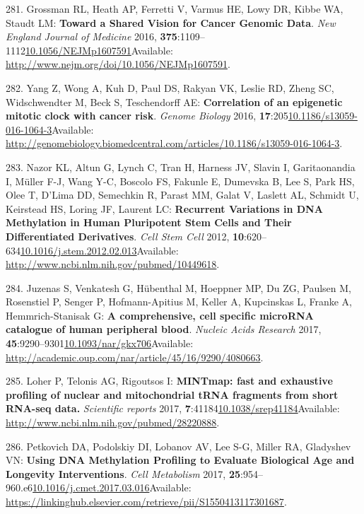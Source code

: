 \documentclass[
]{book}
\begin{document}
\leavevmode\hypertarget{ref-Grossman2016}{}%
281. Grossman RL, Heath AP, Ferretti V, Varmus HE, Lowy DR, Kibbe WA, Staudt LM: \textbf{Toward a Shared Vision for Cancer Genomic Data}. \emph{New England Journal of Medicine} 2016, \textbf{375}:1109--1112\href{https://doi.org/10.1056/NEJMp1607591}{10.1056/NEJMp1607591}Available: \url{http://www.nejm.org/doi/10.1056/NEJMp1607591}.

\leavevmode\hypertarget{ref-Yang2016}{}%
282. Yang Z, Wong A, Kuh D, Paul DS, Rakyan VK, Leslie RD, Zheng SC, Widschwendter M, Beck S, Teschendorff AE: \textbf{Correlation of an epigenetic mitotic clock with cancer risk}. \emph{Genome Biology} 2016, \textbf{17}:205\href{https://doi.org/10.1186/s13059-016-1064-3}{10.1186/s13059-016-1064-3}Available: \url{http://genomebiology.biomedcentral.com/articles/10.1186/s13059-016-1064-3}.

\leavevmode\hypertarget{ref-Nazor2012}{}%
283. Nazor KL, Altun G, Lynch C, Tran H, Harness JV, Slavin I, Garitaonandia I, Müller F-J, Wang Y-C, Boscolo FS, Fakunle E, Dumevska B, Lee S, Park HS, Olee T, D'Lima DD, Semechkin R, Parast MM, Galat V, Laslett AL, Schmidt U, Keirstead HS, Loring JF, Laurent LC: \textbf{Recurrent Variations in DNA Methylation in Human Pluripotent Stem Cells and Their Differentiated Derivatives}. \emph{Cell Stem Cell} 2012, \textbf{10}:620--634\href{https://doi.org/10.1016/j.stem.2012.02.013}{10.1016/j.stem.2012.02.013}Available: \url{http://www.ncbi.nlm.nih.gov/pubmed/10449618}.

\leavevmode\hypertarget{ref-Juzenas2017}{}%
284. Juzenas S, Venkatesh G, Hübenthal M, Hoeppner MP, Du ZG, Paulsen M, Rosenstiel P, Senger P, Hofmann-Apitius M, Keller A, Kupcinskas L, Franke A, Hemmrich-Stanisak G: \textbf{A comprehensive, cell specific microRNA catalogue of human peripheral blood}. \emph{Nucleic Acids Research} 2017, \textbf{45}:9290--9301\href{https://doi.org/10.1093/nar/gkx706}{10.1093/nar/gkx706}Available: \url{http://academic.oup.com/nar/article/45/16/9290/4080663}.

\leavevmode\hypertarget{ref-Loher2017}{}%
285. Loher P, Telonis AG, Rigoutsos I: \textbf{MINTmap: fast and exhaustive profiling of nuclear and mitochondrial tRNA fragments from short RNA-seq data.} \emph{Scientific reports} 2017, \textbf{7}:41184\href{https://doi.org/10.1038/srep41184}{10.1038/srep41184}Available: \url{http://www.ncbi.nlm.nih.gov/pubmed/28220888}.

\leavevmode\hypertarget{ref-Petkovich2017}{}%
286. Petkovich DA, Podolskiy DI, Lobanov AV, Lee S-G, Miller RA, Gladyshev VN: \textbf{Using DNA Methylation Profiling to Evaluate Biological Age and Longevity Interventions}. \emph{Cell Metabolism} 2017, \textbf{25}:954--960.e6\href{https://doi.org/10.1016/j.cmet.2017.03.016}{10.1016/j.cmet.2017.03.016}Available: \url{https://linkinghub.elsevier.com/retrieve/pii/S1550413117301687}.
\end{document}
